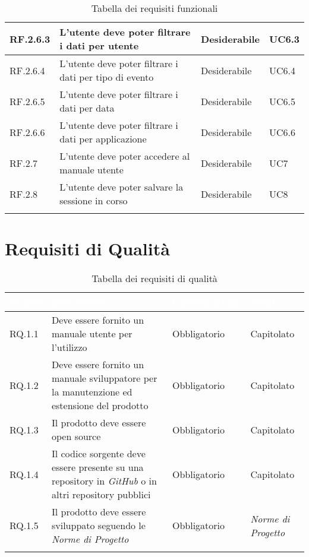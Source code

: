 \begin{center}
\begin{longtable}{|L{1,5cm}|C{5,5cm}|C{3cm}|C{2cm}|}
    RF.2.6.3 & L'utente deve poter filtrare i dati per utente & Desiderabile & UC6.3 \\ \hline
    RF.2.6.4 & L'utente deve poter filtrare i dati per tipo di evento & Desiderabile & UC6.4 \\ \hline
    RF.2.6.5 & L'utente deve poter filtrare i dati per data & Desiderabile & UC6.5 \\ \hline
    RF.2.6.6 & L'utente deve poter filtrare i dati per applicazione & Desiderabile & UC6.6 \\ \hline
    RF.2.7 & L'utente deve poter accedere al manuale utente & Desiderabile & UC7 \\ \hline
    RF.2.8 & L'utente deve poter salvare la sessione in corso & Desiderabile & UC8 \\ \hline

    \caption{Tabella dei requisiti funzionali}
  \end{longtable}
\end{center}

\section{Requisiti di Qualità}
\begin{center}
  \centering
  \begin{longtable}{|L{1,5cm}|C{5,5cm}|C{3cm}|C{2cm}|}
    \hline
    \textcolor[HTML]{FFFFFF}{\textbf{Codice}} & \textcolor[HTML]{FFFFFF}{\textbf{Descrizione}} & \textcolor[HTML]{FFFFFF}{\textbf{Classificazione}} & \textcolor[HTML]{FFFFFF}{\textbf{Fonti}}
    \\ \hline
    RQ.1.1 & Deve essere fornito un manuale utente per l'utilizzo & Obbligatorio & Capitolato \\ \hline
    RQ.1.2 & Deve essere fornito un manuale sviluppatore per la manutenzione ed estensione del prodotto & Obbligatorio & Capitolato \\ \hline
    RQ.1.3 & Il prodotto deve essere open source & Obbligatorio & Capitolato \\ \hline
    RQ.1.4 & Il codice sorgente deve essere presente su una repository in \textit{GitHub} o in altri repository pubblici & Obbligatorio & Capitolato \\ \hline
    RQ.1.5 & Il prodotto deve essere sviluppato seguendo le \textit{Norme di Progetto} & Obbligatorio & \textit{Norme di Progetto} \\ \hline

    \caption{Tabella dei requisiti di qualità}
  \end{longtable}
\end{center}

